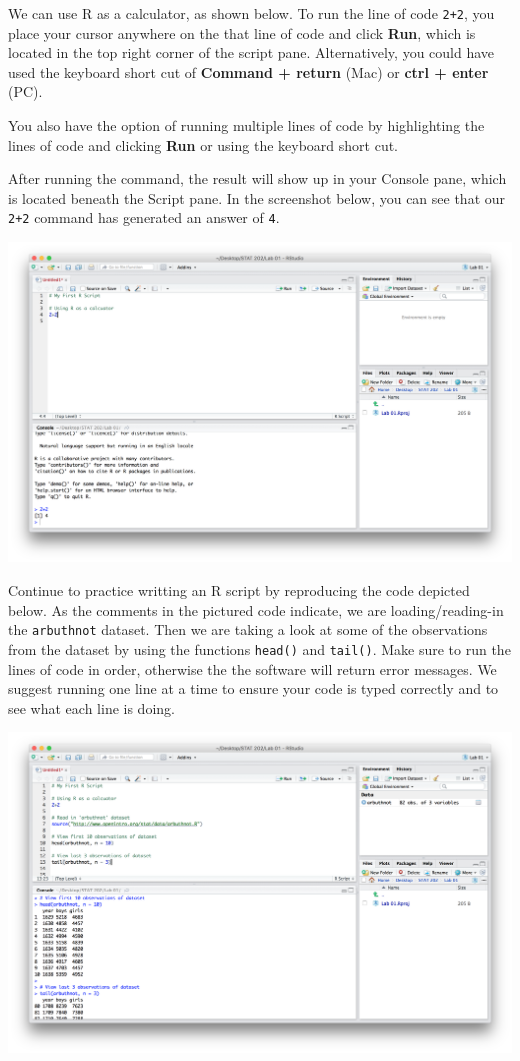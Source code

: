 \documentclass[]{book}
\theoremstyle{definition}
\theoremstyle{definition}
\theoremstyle{definition}
\theoremstyle{remark}
\begin{document}
We can use R as a calculator, as shown below. To run the line of code
\texttt{2+2}, you place your cursor anywhere on the that line of code
and click \textbf{Run}, which is located in the top right corner of the
script pane. Alternatively, you could have used the keyboard short cut
of \textbf{Command + return} (Mac) or \textbf{ctrl + enter} (PC).

You also have the option of running multiple lines of code by
highlighting the lines of code and clicking \textbf{Run} or using the
keyboard short cut.

After running the command, the result will show up in your Console pane,
which is located beneath the Script pane. In the screenshot below, you
can see that our \texttt{2+2} command has generated an answer of
\texttt{4}.

\includegraphics{./assets/images/01-07.png}

Continue to practice writting an R script by reproducing the code
depicted below. As the comments in the pictured code indicate, we are
loading/reading-in the \texttt{arbuthnot} dataset. Then we are taking a
look at some of the observations from the dataset by using the functions
\texttt{head()} and \texttt{tail()}. Make sure to run the lines of code
in order, otherwise the the software will return error messages. We
suggest running one line at a time to ensure your code is typed
correctly and to see what each line is doing.

\includegraphics{./assets/images/01-08.png}
\end{document}
